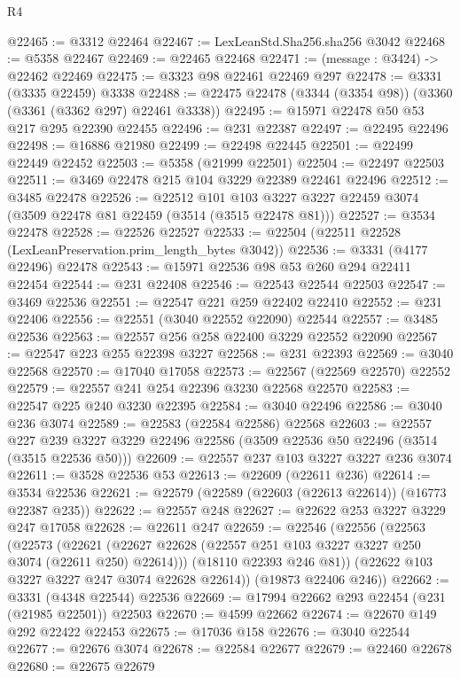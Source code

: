 \begin{lexlean}{R4}
\begin{coremodule}
@22465 := @3312 @22464
@22467 := LexLeanStd.Sha256.sha256 @3042
@22468 := @5358 @22467
@22469 := @22465 @22468
@22471 := (message : @3424) -> @22462 @22469
@22475 := @3323 @98 @22461 @22469 @297
@22478 := @3331 (@3335 @22459) @3338
@22488 := @22475 @22478 (@3344 (@3354 @98)) (@3360 (@3361 (@3362 @297) @22461 @3338))
@22495 := @15971 @22478 @50 @53 @217 @295 @22390 @22455
@22496 := @231 @22387
@22497 := @22495 @22496
@22498 := @16886 @21980
@22499 := @22498 @22445
@22501 := @22499 @22449 @22452
@22503 := @5358 (@21999 @22501)
@22504 := @22497 @22503
@22511 := @3469 @22478 @215 @104 @3229 @22389 @22461 @22496
@22512 := @3485 @22478
@22526 := @22512
    @101
    @103
    @3227
    @3227
    @22459
    @3074
    (@3509 @22478 @81 @22459 (@3514 (@3515 @22478 @81)))
@22527 := @3534 @22478
@22528 := @22526 @22527
@22533 := @22504 (@22511 @22528 (LexLeanPreservation.prim_length_bytes @3042))
@22536 := @3331 (@4177 @22496) @22478
@22543 := @15971 @22536 @98 @53 @260 @294 @22411 @22454
@22544 := @231 @22408
@22546 := @22543 @22544 @22503
@22547 := @3469 @22536
@22551 := @22547 @221 @259 @22402 @22410
@22552 := @231 @22406
@22556 := @22551 (@3040 @22552 @22090) @22544
@22557 := @3485 @22536
@22563 := @22557 @256 @258 @22400 @3229 @22552 @22090
@22567 := @22547 @223 @255 @22398 @3227
@22568 := @231 @22393
@22569 := @3040 @22568
@22570 := @17040 @17058
@22573 := @22567 (@22569 @22570) @22552
@22579 := @22557 @241 @254 @22396 @3230 @22568 @22570
@22583 := @22547 @225 @240 @3230 @22395
@22584 := @3040 @22496
@22586 := @3040 @236 @3074
@22589 := @22583 (@22584 @22586) @22568
@22603 := @22557
    @227
    @239
    @3227
    @3229
    @22496
    @22586
    (@3509 @22536 @50 @22496 (@3514 (@3515 @22536 @50)))
@22609 := @22557 @237 @103 @3227 @3227 @236 @3074
@22611 := @3528 @22536 @53
@22613 := @22609 (@22611 @236)
@22614 := @3534 @22536
@22621 := @22579 (@22589 (@22603 (@22613 @22614)) (@16773 @22387 @235))
@22622 := @22557 @248
@22627 := @22622 @253 @3227 @3229 @247 @17058
@22628 := @22611 @247
@22659 := @22546
    (@22556
      (@22563
        (@22573
          (@22621 (@22627 @22628 (@22557 @251 @103 @3227 @3227 @250 @3074 (@22611 @250) @22614)))
          (@18110 @22393 @246 @81))
        (@22622 @103 @3227 @3227 @247 @3074 @22628 @22614))
      (@19873 @22406 @246))
@22662 := @3331 (@4348 @22544) @22536
@22669 := @17994 @22662 @293 @22454 (@231 (@21985 @22501)) @22503
@22670 := @4599 @22662
@22674 := @22670 @149 @292 @22422 @22453
@22675 := @17036 @158
@22676 := @3040 @22544
@22677 := @22676 @3074
@22678 := @22584 @22677
@22679 := @22460 @22678
@22680 := @22675 @22679

\end{coremodule}
\end{lexlean}
